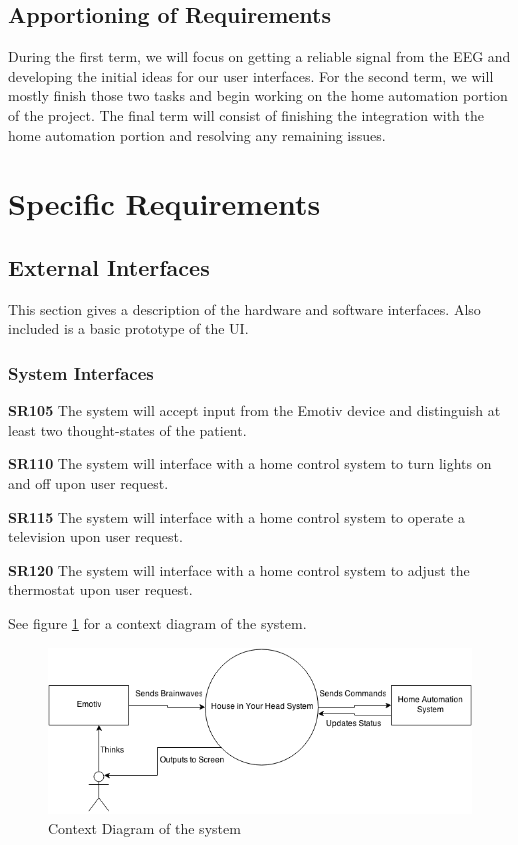 \documentclass{article}
\begin{document}
\subsection{Apportioning of Requirements}

During the first term, we will focus on getting a reliable signal from the EEG
and developing the initial ideas for our user interfaces. For the second term,
we will mostly finish those two tasks and begin working on the home automation
portion of the project. The final term will consist of finishing the
integration with the home automation portion and resolving any remaining
issues.

\newpage

\section{Specific Requirements}

\subsection{External Interfaces}

This section gives a description of the hardware and software interfaces. Also included is a basic prototype of the UI.

\subsubsection{System Interfaces}

\textbf{SR105} The system will accept input from the Emotiv device and
distinguish at least two thought-states of the patient.

\textbf{SR110} The system will interface with a home control system to turn
lights on and off upon user request.

\textbf{SR115} The system will interface with a home control system to operate
a television upon user request.

\textbf{SR120} The system will interface with a home control system to adjust
the thermostat upon user request.

See figure \ref{fig:contextdia} for a context diagram of the system.

\begin{figure}
\includegraphics[width=\textwidth]{Senior_Design_Context_Diagram_V1.png}
\caption{Context Diagram of the system}
\label{fig:contextdia}
\end{figure}
\end{document}
